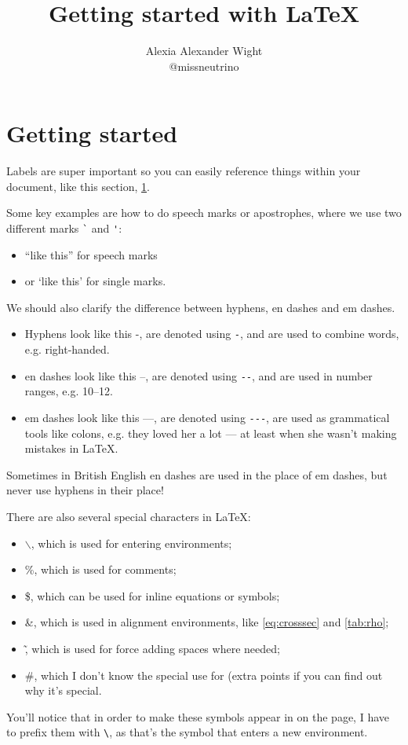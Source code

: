 \documentclass[12pt]{article}
\title{Getting started with \LaTeX}
\author{Alexia Alexander Wight \\ @missneutrino}
\begin{document}
\maketitle %

\begin{abstract}
\end{abstract}


\section{Getting started}
\label{sec:start} 

Labels are super important so you can easily reference things within your document, like this section, \cref{sec:start}. 

Some key examples are how to do speech marks or apostrophes, where we use two different marks \verb|`| and \verb|'|:
\begin{itemize}
	\item ``like this'' for speech marks
	\item or `like this' for single marks.
\end{itemize}


We should also clarify the difference between hyphens, en dashes and em dashes.
\begin{itemize}
	\item Hyphens look like this -, are denoted using \verb|-|, and are used to combine words, e.g. right-handed.
	\item en dashes look like this --, are denoted using \verb|--|, and are used in number ranges, e.g. 10--12.
	\item em dashes look like this ---, are denoted using \verb|---|, are used as grammatical tools like colons, e.g. they loved her a lot --- at least when she wasn't making mistakes in \LaTeX. 
\end{itemize}
Sometimes in British English en dashes are used in the place of em dashes, but never use hyphens in their place! 

There are also several special characters in \LaTeX:
\begin{itemize}
    \item \(\backslash\), which is used for entering environments;
    \item \%, which is used for comments;
    \item \$, which can be used for inline equations or symbols;
    \item \&, which is used in alignment environments, like \cref{eq:crosssec} and \cref{tab:rho};
    \item \~, which is used for force adding spaces where needed;
    \item \#, which I don't know the special use for (extra points if you can find out why it's special.
\end{itemize}
You'll notice that in order to make these symbols appear in on the page, I have to prefix them with \verb|\|, as that's the symbol that enters a new environment.
\end{document}
